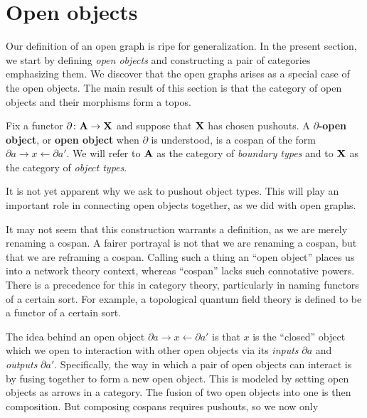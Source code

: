 %
%


\section{Open objects} %
\label{sec:OpenObjects}

Our definition of an open graph is ripe for generalization.  In the present section, we start by defining \emph{open objects} and constructing a pair of categories emphasizing them.  We discover that the open graphs arises as a special case of the open objects.  The main result of this section is that the category of open objects and their morphisms form a topos.  

\begin{df} \label{df:OpenObject}
	Fix a functor $ \partial \colon \mathbf{A} \to \mathbf{X} $ and suppose that $ \mathbf{X} $ has chosen pushouts. A \textbf{$ \partial $-open object}, or \textbf{open object} when $ \partial $ is understood, is a cospan of the form $ \partial a \to x \gets \partial a' $.  We will refer to $ \mathbf{A} $ as the category of \emph{boundary types} and to $ \mathbf{X} $ as the category of \emph{object types}.
\end{df}

\begin{remark}
	It is not yet apparent why we ask to pushout object types. This will play an important role in connecting open objects together, as we did with open graphs.
\end{remark}

\begin{remark}
	It may not seem that this construction warrants a definition, as we are merely renaming a cospan.  A fairer portrayal is not that we are renaming a cospan, but that we are reframing a cospan. Calling such a thing an ``open object'' places us into a network theory context, whereas ``cospan'' lacks such connotative powers.  There is a precedence for this in category theory, particularly in naming functors of a certain sort.  For example, a topological quantum field theory is defined to be a functor of a certain sort.  
\end{remark}

The idea behind an open object $ \partial a \to x \gets \partial a' $ is that $ x $ is the ``closed'' object which we open to interaction with other open objects via its \emph{inputs} $ \partial a $ and \emph{outputs} $ \partial a' $.  Specifically, the way in which a pair of open objects can interact is by fusing together to form a new open object.  This is modeled by setting open objects as arrows in a category.  The fusion of two open objects into one is then composition.  But composing cospans requires pushouts, so we now only 

